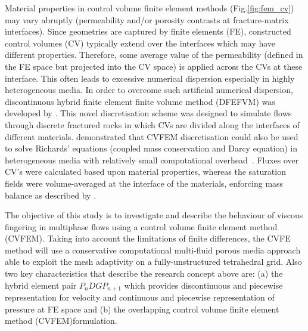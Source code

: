 \documentclass[preprint,authoryear,12pt]{elsarticle}
\newcommand{\KCnote}[1]{\fbox{\parbox{\textwidth}{ \color{black} KC Note $\Rightarrow$ #1}}}
\begin{document}
Material properties in control volume finite element methods (Fig.\ref{fig:fem_cv}) may vary abruptly (permeability and/or porosity contrasts at fracture-matrix interfaces). Since geometries are captured by finite elements (FE), constructed control volumes (CV) typically extend over the interfaces which may have different properties. Therefore, some average value of the permeability (defined in the FE space but projected into the CV space) is applied across the CVs at these interface. This often leads to excessive numerical dispersion especially in highly heterogeneous media. In order to overcome such artificial numerical dispersion, discontinuous hybrid finite element finite volume method (DFEFVM) was developed by \citet{nick_2011b, nick_2011a}. This novel discretisation scheme was designed to simulate flows through discrete fractured rocks in which CVs are divided along the interfaces of different materials. \citet{cumming_2011} demonstrated that CVFEM discretisation could also be used to solve Richards' equations (coupled mass conservation and Darcy equation) in heterogeneous media with relatively small computational overhead~\citep[compared with traditional coupled velocity-pressure based formulations, see also][]{cumming_phd2012}. Fluxes over CV's were calculated based upon material properties, whereas the saturation fields were volume-averaged at the interface of the materials, enforcing mass balance as described by \citet{kirkland_1992}.


\medskip
The objective of this study is to investigate and describe the behaviour of viscous fingering in multiphase flows using a control volume finite element method (CVFEM). Taking into account the limitations of finite differences, the CVFE method  will use a conservative computational multi-fluid porous media approach able to exploit the mesh adaptivity on a fully-unstructured tetrahedral grid. Also two key characteristics that describe the research concept above are: (a) the hybrid element pair $P_{n}DGP_{n+1}$ which provides discontinuous and piecewise representation for velocity and continuous and piecewise representation of pressure at FE space and (b) the overlapping control volume finite element method (CVFEM)formulation.
\end{document}
